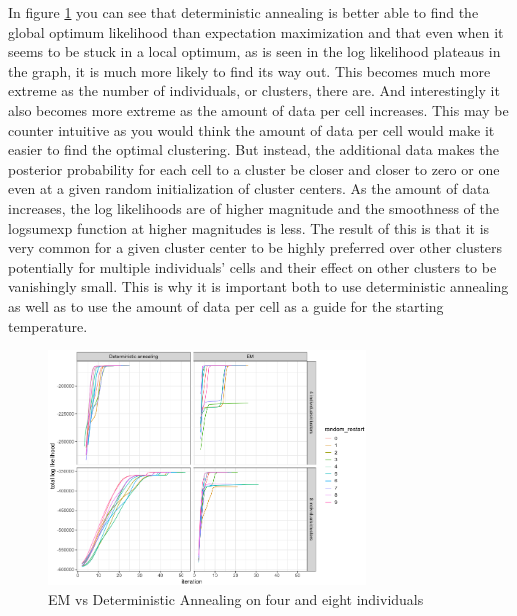 \par{
In figure \ref{figure:annealing} you can see that deterministic annealing is better able to find the global optimum likelihood than expectation maximization and that even when it seems to be stuck in a local optimum, as is seen in the log likelihood plateaus in the graph, it is much more likely to find its way out. This becomes much more extreme as the number of individuals, or clusters, there are. And interestingly it also becomes more extreme as the amount of data per cell increases. This may be counter intuitive as you would think the amount of data per cell would make it easier to find the optimal clustering. But instead, the additional data makes the posterior probability for each cell to a cluster be closer and closer to zero or one even at a given random initialization of cluster centers. As the amount of data increases, the log likelihoods are of higher magnitude and the smoothness of the logsumexp function at higher magnitudes is less. The result of this is that it is very common for a given cluster center to be highly preferred over other clusters potentially for multiple individuals' cells and their effect on other clusters to be vanishingly small. This is why it is important both to use deterministic annealing as well as to use the amount of data per cell as a guide for the starting temperature.
}


\begin{figure}[th!]
\caption{EM vs Deterministic Annealing on four and eight individuals}
\label{figure:annealing}
\begin{centering}

\includegraphics[width=0.75\textwidth]{annealing.png} 
\end{centering}


\end{figure}


